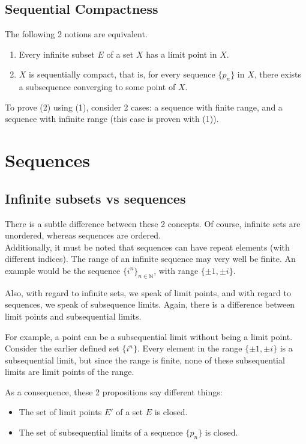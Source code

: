 \documentclass{article}
\begin{document}
\subsection{Sequential Compactness}
The following 2 notions are equivalent.
\begin{enumerate}
	\item Every infinite subset $E$ of a set $X$ has a limit point in $X$.
	\item $X$ is sequentially compact, that is, for every sequence $\{p_n\}$ in $X$, there exists a subsequence converging to some point of $X$.
\end{enumerate}

To prove (2) using (1), consider 2 cases: a sequence with finite range, and a sequence with infinite range (this case is proven with (1)).

\section{Sequences}
\subsection{Infinite subsets vs sequences}
There is a subtle difference between these 2 concepts. Of course, infinite sets are unordered, whereas sequences are ordered. \\
Additionally, it must be noted that sequences can have repeat elements (with different indices). The range of an infinite sequence may very well be finite. An example would be the sequence $\{i^n\}_{n\in \mathbb{N}}$, with range $\{\pm 1, \pm i\}$.

Also, with regard to infinite sets, we speak of limit points, and with regard to sequences, we speak of subsequence limits. Again, there is a difference between limit points and subsequential limits.

For example, a point can be a subsequential limit without being a limit point. Consider the earlier defined set $\{i^n\}$. Every element in the range $\{\pm 1, \pm i\}$ is a subsequential limit, but since the range is finite, none of these subsequential limits are limit points of the range.

As a consequence, these 2 propositions say different things:
\begin{itemize}
	\item The set of limit points $E'$ of a set $E$ is closed.
	\item The set of subsequential limits of a sequence $\{p_n\}$ is closed.
\end{itemize}
\end{document}
